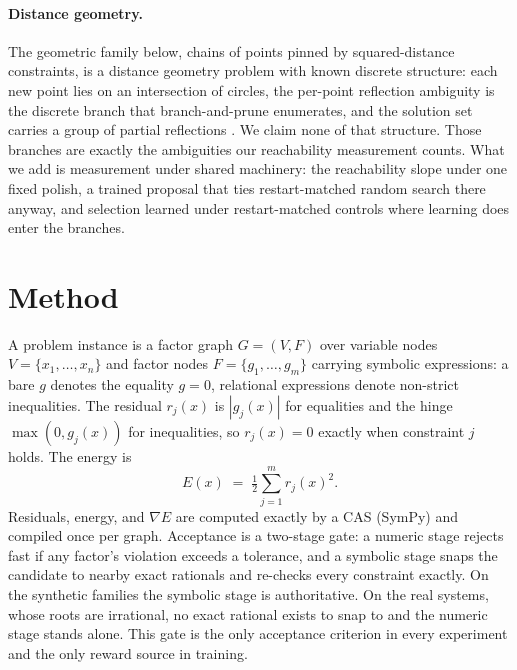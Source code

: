 \documentclass[letterpaper]{article} %
\begin{document}
\paragraph{Distance geometry.}
The geometric family below, chains of points pinned by squared-distance
constraints, is a distance geometry problem with known discrete structure: each new point
lies on an intersection of circles, the per-point reflection ambiguity is the discrete branch
that branch-and-prune enumerates, and the solution set carries a group of partial reflections
\citep{lavor2012dmdgp, liberti2014distance}. We claim none of that structure. Those branches
are exactly the ambiguities our reachability measurement counts. What we add is measurement
under shared machinery: the reachability slope under one fixed polish, a trained proposal
that ties restart-matched random search there anyway, and selection learned under
restart-matched controls where learning does enter the branches.

\section{Method}
\label{sec:method}

A problem instance is a factor graph $G = (V, F)$ over variable nodes $V = \{x_1, \dots,
x_n\}$ and factor nodes $F = \{g_1, \dots, g_m\}$ carrying symbolic expressions: a bare $g$
denotes the equality $g = 0$, relational expressions denote non-strict inequalities. The
residual $r_j(x)$ is $|g_j(x)|$ for equalities and the hinge $\max(0, g_j(x))$ for
inequalities, so $r_j(x) = 0$ exactly when constraint $j$ holds. The energy is
\begin{equation}
E(x) \;=\; \tfrac{1}{2} \sum_{j=1}^{m} r_j(x)^2 .
\end{equation}
Residuals, energy, and $\nabla E$ are computed exactly by a CAS (SymPy) and compiled once per
graph. Acceptance is a two-stage gate: a numeric stage rejects fast if any factor's violation
exceeds a tolerance, and a symbolic stage snaps the candidate to nearby exact rationals and
re-checks every constraint exactly. On the synthetic families the symbolic stage is
authoritative. On the real systems, whose roots are irrational, no exact rational exists to snap to
and the numeric stage stands alone. This gate is the only acceptance criterion in every
experiment and the only reward source in training.
\end{document}
